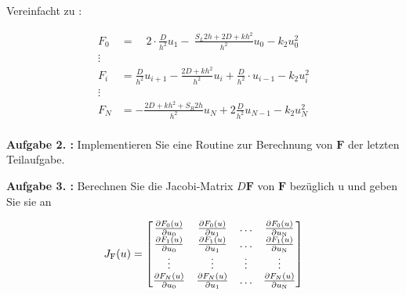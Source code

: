 \begin{qed}
	Vereinfacht zu :

	\begin{align*}
		F_0 & = \quad 2\cdot \frac{D}{h^2}u_1-\ \frac{S_L2h+2D+kh^2}{h^2}
		u_0 -k_2u_0^2                                                     \\
		\vdots                                                            \\
		F_i & =
		\frac{D}{h^2}u_{i+1}-\frac{2D+kh^2}{h^2}u_i+\frac{D}{h^2}\cdot u_{i-1}
		-k_2u_i^2                                                         \\
		\vdots                                                            \\
		F_N & =
		-\frac{2D+kh^2+S_R2h}{h^2}u_N+2\frac{D}{h^2}u_{N-1}-k_2u^2_N      \\
	\end{align*}
\end{qed}

\begin{mybox}
	\textbf{Aufgabe 2. :} Implementieren Sie eine Routine zur Berechnung
	von $\mathbf{F}$ der letzten Teilaufgabe.\cite{Prof.Dr.AndreasZeiser.April2021}
\end{mybox}

\begin{figure}[htb]
	
\end{figure}

\begin{mybox}
	\textbf{Aufgabe 3. :} Berechnen Sie die Jacobi-Matrix $D\mathbf{F}$ von
	$\mathbf{F}$ bezüglich u und geben Sie sie an
\end{mybox}
\begin{equation}
	J_\mathrm{F}(u)=
	\begin{bmatrix}
		\pdv{F_0(u)}{u_0} & \pdv{F_0(u)}{u_1} & \dots  &
		\pdv{F_0(u)}{u_\mathrm{N}}                              \\
		\pdv{F_1(u)}{u_0} & \pdv{F_1(u)}{u_1} & \dots  &
		\pdv{F_1(u)}{u_\mathrm{N}}                              \\
		\vdots            & \vdots            & \vdots & \vdots \\
		\pdv{F_N(u)}{u_0} & \pdv{F_N(u)}{u_1} & \dots  &
		\pdv{F_N(u)}{u_\mathrm{N}}

	\end{bmatrix}
\end{equation}

